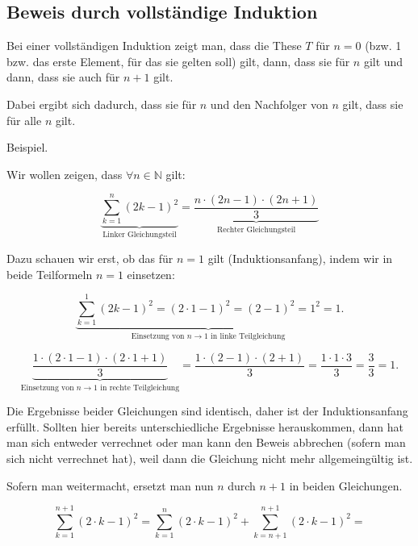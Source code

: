 \documentclass{scrartcl}
\begin{document}
\subsection{Beweis durch vollständige Induktion}

Bei einer vollständigen Induktion zeigt man, dass die These $T$ für $n = 0$ (bzw. 1 bzw. das erste Element, für das sie gelten soll) gilt,
dann, dass sie für $n$ gilt und dann, dass sie auch für $n + 1$ gilt.

Dabei ergibt sich dadurch, dass sie für $n$ und den Nachfolger von $n$ gilt, dass sie für alle $n$ gilt.

Beispiel.

Wir wollen zeigen, dass $\forall n \in \mathbb{N}$ gilt:

\begin{equation}
	\underbrace{\sum_{k = 1}^n (2k - 1)^2}_{\textrm{Linker\ Gleichungsteil}} = 
	\underbrace{\frac{n\cdot (2n - 1) \cdot (2n + 1)}{3}}_{\textrm{Rechter\ Gleichungsteil}}
\end{equation}

Dazu schauen wir erst, ob das für $n = 1$ gilt (Induktionsanfang), indem
wir in beide Teilformeln $n = 1$ einsetzen:

\begin{equation}
	\underbrace{\sum_{k = 1}^1 (2k -1)^2 = (2\cdot 1 - 1)^2 = (2 - 1)^2 = 1^2 = 1}_{\textrm{Einsetzung\ von\ } n \rightarrow 1\textrm{\ in\ linke\ Teilgleichung}}.
\end{equation}

\begin{equation}
	\underbrace{\frac{1 \cdot (2\cdot 1 - 1) \cdot (2\cdot 1 + 1)}{3}}_{\textrm{Einsetzung\ von\ } n \rightarrow 1\textrm{\ in\ rechte\ Teilgleichung}} =
	\frac{1 \cdot (2 - 1) \cdot (2 + 1)}{3} =
	\frac{1 \cdot 1 \cdot 3}{3} =
	\frac{3}{3} = 1.
\end{equation}

Die Ergebnisse beider Gleichungen sind identisch, daher ist der Induktionsanfang
erfüllt. Sollten hier bereits unterschiedliche Ergebnisse herauskommen,
dann hat man sich entweder verrechnet oder man kann den Beweis abbrechen (sofern
man sich nicht verrechnet hat), weil dann die Gleichung nicht mehr allgemeingültig
ist.

Sofern man weitermacht, ersetzt man nun $n$ durch $n + 1$ in beiden
Gleichungen.

\begin{equation}
	\sum_{k = 1}^{n + 1} (2\cdot k - 1)^2 = 
	\sum_{k = 1}^{n} (2 \cdot k - 1)^2 + \sum_{k = n + 1}^{n + 1} (2 \cdot k -1)^2 =
\end{equation}
\end{document}
